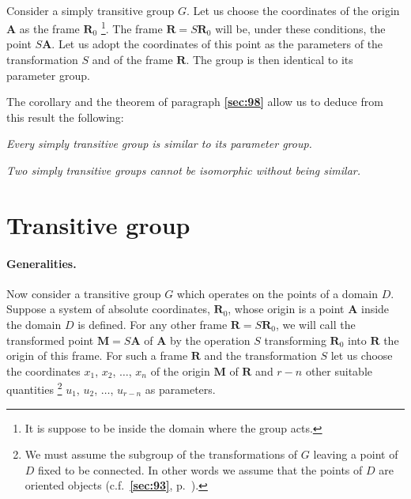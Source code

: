 \documentclass[leqno,11pt]{book}
\numberwithin{equation}{chapter}
\theoremstyle{shape1}
\theoremstyle{shapesmall}
\newcommand{\fsref}[1]{{\rm\textsection\textbf{\ref{sec:#1}}}}
\newcommand{\somespace}{\vspace{9pt}}
\begin{document}
\paragraph{}
\label{sec:99}
Consider a simply transitive group $G$. Let us choose the coordinates of the origin $\mathbf{A}$ as the frame $\mathbf{R}_{0}$ \footnote{It is suppose to be inside the domain where the group acts.}. The frame $\mathbf{R}=S\mathbf{R}_{0}$ will be, under these conditions, the point $S\mathbf{A}$. Let us adopt the coordinates of this point as the parameters of the transformation $S$ and of the frame $\mathbf{R}$. The group is then identical to its parameter group.

The corollary and the theorem of paragraph \fsref{98} allow us to deduce from this result the following:

\somespace

\emph{Every simply transitive group is similar to its parameter group.}

\emph{Two simply transitive groups cannot be isomorphic without being similar.}


\section{Transitive group}
\label{sec:transitive-group}

\paragraph{Generalities.}
\label{sec:100}
Now consider a transitive group $G$ which operates on the points of a domain $D$. Suppose a system of absolute coordinates, $\mathbf{R}_{0}$, whose origin is a point $\mathbf{A}$ inside the domain $D$ is defined. For any other frame $\mathbf{R}=S\mathbf{R}_{0}$, we will call the transformed point $\mathbf{M}=S\mathbf{A}$ of $\mathbf{A}$ by the operation $S$ transforming $\mathbf{R}_{0}$ into $\mathbf{R}$ the origin of this frame. For such a frame $\mathbf{R}$ and the transformation $S$ let us choose the coordinates $x_{1}$, $x_{2}$, $\dots$, $x_{n}$ of the origin $\mathbf{M}$ of $\mathbf{R}$ and $r-n$ other suitable quantities \footnote{We must assume the subgroup of the transformations of $G$ leaving a point of $D$ fixed to be connected. In other words we assume that the points of $D$ are oriented objects (c.f.~\fsref{93}, p.~\pageref{sec:93}).} $u_{1}$, $u_{2}$, $\dots$, $u_{r-n}$ as parameters.
\end{document}
